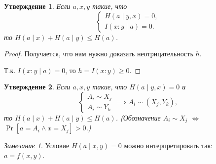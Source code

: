 \documentclass[12pt]{article}
\theoremstyle{definition}
\theoremstyle{plain}
\newtheorem{statement}{Утверждение}[section]
\theoremstyle{remark}
\newtheorem{remark}{Замечание}[section]
\begin{document}
\begin{statement}
    Если $a,x,y$ такие, что
\[
    \begin{cases}
        H(a\mid y,x) = 0,\\
        I(x:y\mid a) = 0.
    \end{cases}
\]
то  \(H(a\mid x) + H(a\mid y) \le H(a)\).
\end{statement}
\begin{proof}
    Получается, что нам нужно доказать неотрицательность $h$. 
    \begin{center}
    \end{center}
Т.к. $I(x:y\mid a) = 0$, то $h = I(x:y)\ge 0$.
\end{proof}
\begin{statement}
    Если $a,x,y$ такие, что $H(a\mid y,x) = 0$ и
\[
    \begin{cases}
        A_i \sim X_j\\
        A_i \sim Y_k
    \end{cases} \implies A_i\sim(X_j,Y_k),
\]
то  \(H(a\mid x) + H(a\mid y) \le H(a)\). (Обозначение $A_i\sim X_j$ $\iff$ $\Pr[a=A_i \land x=X_j]>0$.)
\end{statement}
\begin{remark}
    Условие $H(a\mid x,y) = 0$ можно интерпретировать так: $a = f(x,y)$.
\end{remark}
\end{document}
